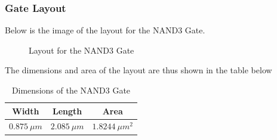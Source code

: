 \documentclass[12pt]{article}
\begin{document}
\subsubsection{Gate Layout}
Below is the image of the layout for the NAND3 Gate.
\begin{figure} [H]
    \centering
    \caption{Layout for the NAND3 Gate}
\end{figure}
The dimensions and area of the layout are thus shown in the table below
\begin{table} [H]
    \centering
    \begin{tabular}{ccc}
        Width & Length &  Area\\
        \hline
        $\SI{0.875}{\mu m}$ & $\SI{2.085}{\mu m}$ & $\SI{1.8244}{\mu m^2}$
    \end{tabular}
    \caption{Dimensions of the NAND3 Gate}
\end{table}
\end{document}

